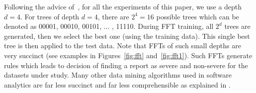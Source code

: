 Following the advice of~\cite{fu2018building,chen2018applications,phillips2017fftrees}, for all the experiments of this paper, we use a depth    $d=4$. 
For trees of depth $d=4$, there are $2^4=16$ possible trees which can be denoted as 00001, 00010, 00101, ... , 11110. During FFT training, all $2^d$ trees are generated, then we select the best one (using the training data).
 This single best tree is then applied to the test data.
 Note that FFTs of such small
depths are very succinct
(see examples in Figures~\ref{fig:fft} and~\ref{fig:fft1}). Such FFTs generate rules which leads to decision of finding a report as severe and non-severe for the datasets under study. Many other data mining algorithms used in software analytics are far less
succinct and far less comprehensible as explained in .






